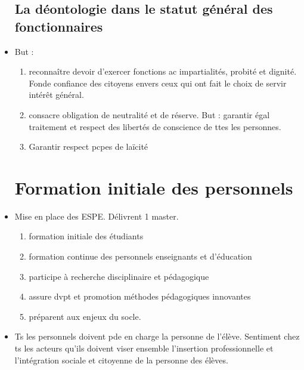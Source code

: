 \documentclass[12pt]{report}
\begin{document}
\begin{itemize}
\subsection{La déontologie dans le statut général des fonctionnaires} 

\item But : 

\begin{enumerate}
\item reconnaître devoir d'exercer fonctions ac impartialités, probité et dignité. Fonde confiance des citoyens envers ceux qui ont fait le choix de servir intérêt général. \\
\item consacre obligation de neutralité et de réserve. But : garantir égal traitement et respect des libertés de conscience de ttes les personnes. \\
\item Garantir respect pcpes de laïcité \\
\end{enumerate}

\section{Formation initiale des personnels}

\item Mise en place des ESPE. Délivrent 1 master.
\begin{enumerate}
\item formation initiale des étudiants \\
\item formation continue des personnels enseignants et d'éducation \\
\item participe à recherche disciplinaire et pédagogique \\
\item assure dvpt et promotion méthodes pédagogiques innovantes \\
\item préparent aux enjeux du socle.
\end{enumerate}

\item Ts les personnels doivent pde en charge la personne de l'élève. Sentiment chez ts les acteurs qu'ils doivent viser ensemble l'insertion professionnelle et l'intégration sociale et citoyenne de la personne des élèves. \\


\end{itemize}
\end{document}
